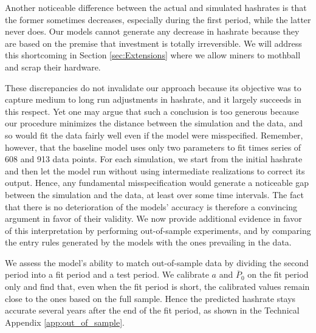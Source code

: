 \documentclass[12pt, a4paper]{article}
\begin{document}
Another noticeable difference between the actual and simulated hashrates
is that the former sometimes decreases, especially during the first period,
while the latter never does. Our models cannot generate any decrease in
hashrate because they are based on the premise that investment is totally
irreversible. We will address this shortcoming in Section \ref{sec:Extensions}
where we allow miners to mothball and scrap their
hardware.


These discrepancies do not invalidate our approach because its objective
was to capture medium to long run adjustments in hashrate, and it
largely succeeds in this respect. Yet one may argue that
such a conclusion is too generous because our procedure minimizes the
distance between the simulation and the data, and so would fit the data
fairly well even if the model were misspecified. Remember, however,
that the baseline model uses only two parameters to
fit times series of 608 and 913 data points. For each
simulation, we start from the initial hashrate and then
let the model run without using intermediate realizations to correct its
output. Hence, any fundamental
misspecification would generate a noticeable gap between the
simulation and the data, at least over some time intervals. The fact that
there is no deterioration of the models' accuracy is therefore a
convincing argument in favor of their validity. We now provide additional evidence in favor of this
interpretation by performing out-of-sample experiments, and by comparing the entry
rules generated by the models with the ones prevailing in the data.


We assess the model's ability to match
out-of-sample data by dividing the second period into a fit period and a
test period. We calibrate $a$ and $\overline{P}_0$ on the fit period only
and find that, even when the fit period is short, the calibrated
values remain close to the ones based on the full sample. Hence the predicted
hashrate stays accurate several years after the end of the fit period, as shown in
the Technical Appendix \ref{app:out_of_sample}.
\end{document}
